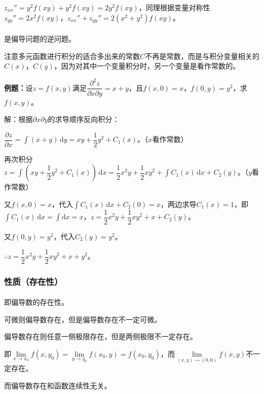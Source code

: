 $z_{xx}''=y^2f(xy)+y^2f(xy)=2y^2f(xy)$，同理根据变量对称性$z_{yy}''=2x^2f(xy)$，$z_{xx}''+z_{yy}''=2(x^2+y^2)f(xy)$。

\paragraph{} \leavevmode \medskip

是偏导问题的逆问题。

注意多元函数进行积分的适合多出来的常数$C$不再是常数，而是与积分变量相关的$C(x)$，$C(y)$，因为对其中一个变量积分时，另一个变量是看作常数的。

\textbf{例题：}设$z=f(x,y)$满足$\dfrac{\partial^2z}{\partial x\partial y}=x+y$，且$f(x,0)=x$，$f(0,y)=y^2$，求$f(x,y)$。

解：根据$\partial x\partial y$的求导顺序反向积分：

$\dfrac{\partial z}{\partial x}=\int(x+y)\,\textrm{d}y=xy+\dfrac{1}{2}y^2+C_1(x)$。（$x$看作常数）

再次积分$z=\displaystyle{\int\left(xy+\dfrac{1}{2}y^2+C_1(x)\right)\,\textrm{d}x}=\dfrac{1}{2}x^2y+\dfrac{1}{2}xy^2+\int C_1(x)\,\textrm{d}x+C_2(y)$。（$y$看作常数）

又$f(x,0)=x$，代入$\int C_1(x)\,\textrm{d}x+C_2(0)=x$，两边求导$C_1(x)=1$，即$\int C_1(x)\,\textrm{d}x=\int\textrm{d}x=x$，$z=\dfrac{1}{2}x^2y+\dfrac{1}{2}xy^2+x+C_2(y)$。

又$f(0,y)=y^2$，代入$C_2(y)=y^2$。

$\therefore z=\dfrac{1}{2}x^2y+\dfrac{1}{2}xy^2+x+y^2$。

\subsubsection{性质（存在性）}

\paragraph{}\leavevmode \medskip

即偏导数的存在性。

可微则偏导数存在，但是偏导数存在不一定可微。

偏导数存在则任意一侧极限存在，但是两侧极限不一定存在。

即$\lim\limits_{x\to x_0}f(x,y_0)=\lim\limits_{y\to y_0}f(x_0,y)=f(x_0,y_0)$，而$\lim\limits_{(x,y)\to(0,0)}f(x,y)$不一定存在。

而偏导数存在和函数连续性无关。

